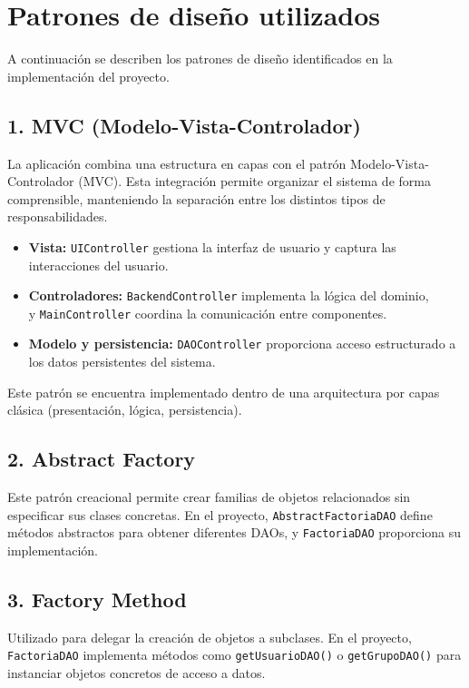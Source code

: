 \section*{Patrones de diseño utilizados}

A continuación se describen los patrones de diseño identificados en la implementación del proyecto.

\subsection*{1. MVC (Modelo-Vista-Controlador)}
La aplicación combina una estructura en capas con el patrón Modelo-Vista-Controlador (MVC). 
Esta integración permite organizar el sistema de forma comprensible, manteniendo la separación entre los distintos tipos de responsabilidades.
\begin{itemize}
    \item \textbf{Vista:} \texttt{UIController} gestiona la interfaz de usuario y captura las interacciones del usuario.
    \item \textbf{Controladores:} \texttt{BackendController} implementa la lógica del dominio,\\
    y \texttt{MainController} coordina la comunicación entre componentes.
    \item \textbf{Modelo y persistencia:} \texttt{DAOController} proporciona acceso estructurado a los datos persistentes del sistema.
\end{itemize}
Este patrón se encuentra implementado dentro de una arquitectura por capas clásica (presentación, lógica, persistencia).

\subsection*{2. Abstract Factory}
Este patrón creacional permite crear familias de objetos relacionados sin especificar sus clases concretas. 
En el proyecto, \texttt{AbstractFactoriaDAO} define métodos abstractos para obtener diferentes DAOs, y \texttt{FactoriaDAO} proporciona su implementación.

\subsection*{3. Factory Method}
Utilizado para delegar la creación de objetos a subclases. 
En el proyecto, \texttt{FactoriaDAO} implementa métodos como \texttt{getUsuarioDAO()} o \texttt{getGrupoDAO()} para instanciar objetos concretos de acceso a datos.

